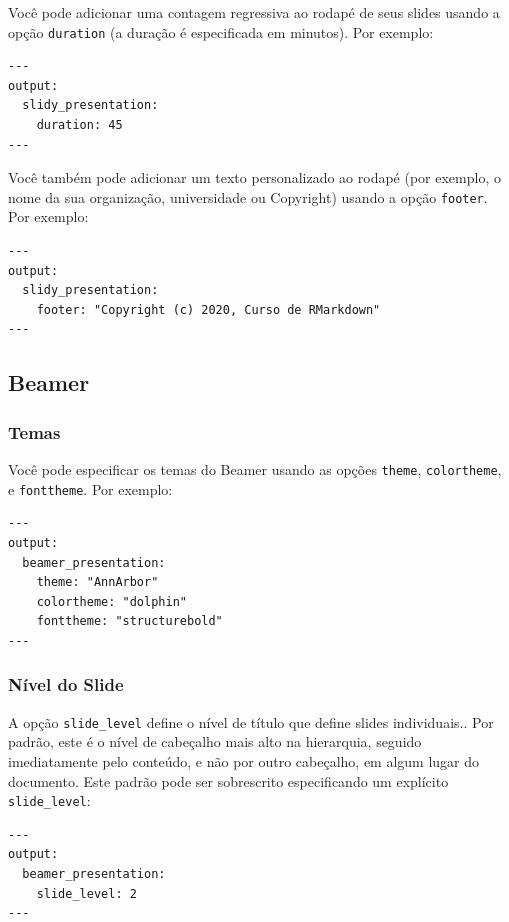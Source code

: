 \documentclass[
]{book}
\begin{document}
Você pode adicionar uma contagem regressiva ao rodapé de seus slides usando a opção \texttt{duration} (a duração é especificada em minutos). Por exemplo:

\begin{verbatim}
---
output:
  slidy_presentation:
    duration: 45
---
\end{verbatim}

Você também pode adicionar um texto personalizado ao rodapé (por exemplo, o nome da sua organização, universidade ou Copyright) usando a opção \texttt{footer}. Por exemplo:

\begin{verbatim}
---
output:
  slidy_presentation:
    footer: "Copyright (c) 2020, Curso de RMarkdown"
---
\end{verbatim}

\hypertarget{beamer}{%
\subsection{Beamer}\label{beamer}}

\hypertarget{temas}{%
\subsubsection*{Temas}\label{temas}}

Você pode especificar os temas do Beamer usando as opções \texttt{theme}, \texttt{colortheme}, e \texttt{fonttheme}. Por exemplo:

\begin{verbatim}
---
output:
  beamer_presentation:
    theme: "AnnArbor"
    colortheme: "dolphin"
    fonttheme: "structurebold"
---
\end{verbatim}

\hypertarget{nuxedvel-do-slide}{%
\subsubsection*{Nível do Slide}\label{nuxedvel-do-slide}}

A opção \texttt{slide\_level} define o nível de título que define slides individuais.. Por padrão, este é o nível de cabeçalho mais alto na hierarquia, seguido imediatamente pelo conteúdo, e não por outro cabeçalho, em algum lugar do documento. Este padrão pode ser sobrescrito especificando um explícito \texttt{slide\_level}:

\begin{verbatim}
---
output:
  beamer_presentation:
    slide_level: 2
---
\end{verbatim}
\end{document}
